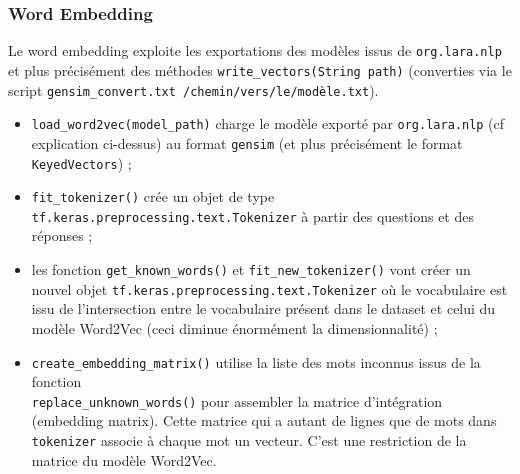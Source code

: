 \documentclass[10pt,a4paper]{article}
\begin{document}
\subsubsection{Word Embedding}
Le word embedding exploite les exportations des modèles issus de \texttt{org.lara.nlp} et plus précisément des méthodes \texttt{write\_vectors(String path)} (converties via le script \texttt{gensim\_convert.txt /chemin/vers/le/modèle.txt}).
\begin{itemize}
\item \texttt{load\_word2vec(model\_path)} charge le modèle exporté par \texttt{org.lara.nlp} (cf explication ci-dessus) au format \texttt{gensim} (et plus précisément le format \texttt{KeyedVectors}) ;
\item \texttt{fit\_tokenizer()} crée un objet de type \texttt{tf.keras.preprocessing.text.Tokenizer} à partir des questions et des réponses ;
\item les fonction \texttt{get\_known\_words()} et \texttt{fit\_new\_tokenizer()} vont créer un nouvel objet \texttt{tf.keras.preprocessing.text.Tokenizer} où le vocabulaire est issu de l'intersection entre le vocabulaire présent dans le dataset et celui du modèle Word2Vec (ceci diminue énormément la dimensionnalité) ;
\item \texttt{create\_embedding\_matrix()} utilise la liste des mots inconnus issus de la fonction \\ \texttt{replace\_unknown\_words()} pour assembler la matrice d'intégration (embedding matrix). Cette matrice qui a autant de lignes que de mots dans \texttt{tokenizer} associe à chaque mot un vecteur. C'est une restriction de la matrice du modèle Word2Vec.
\end{itemize}
\end{document}
